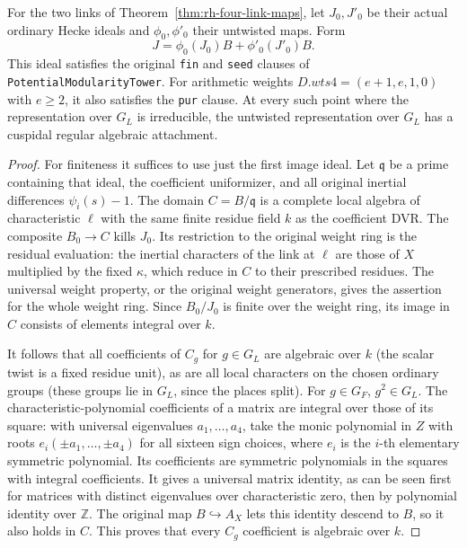 \begin{theorem}
\label{thm:rh-four-image-ideal}
For the two links of Theorem~\ref{thm:rh-four-link-maps}, let
$J_0,J'_0$ be their actual ordinary Hecke ideals and
$\phi_0,\phi'_0$ their untwisted maps. Form
\[
                   J=\phi_0(J_0)B+\phi'_0(J'_0)B .
\]
This ideal satisfies the original \texttt{fin} and
\texttt{seed} clauses of \texttt{PotentialModularityTower}.
For arithmetic weights $D.wts4=(e+1,e,1,0)$ with $e\geq2$,
it also satisfies the \texttt{pur} clause. At every such
point where the representation over $G_L$ is irreducible,
the untwisted representation over $G_L$ has a cuspidal
regular algebraic attachment.
\end{theorem}
\begin{proof}
For finiteness it suffices to use just the first image ideal.
Let $\mathfrak q$ be a prime containing that ideal, the
coefficient uniformizer, and all original inertial
differences $\psi_i(s)-1$. The domain $C=B/\mathfrak q$
is a complete local algebra of characteristic $\ell$ with
the same finite residue field $k$ as the coefficient DVR.
The composite $B_0\to C$ kills $J_0$. Its restriction to
the original weight ring is the residual evaluation:
the inertial characters of the link at $\ell$ are those
of $X$ multiplied by the fixed $\kappa$, which reduce
in $C$ to their prescribed residues. The universal
weight property, or the original weight generators,
gives the assertion for the whole weight ring.
Since $B_0/J_0$ is finite over the weight ring, its image
in $C$ consists of elements integral over $k$.

It follows that all coefficients of $C_g$ for $g\in G_L$
are algebraic over $k$ (the scalar twist is a fixed residue
unit), as are all local characters on the chosen ordinary
groups (these groups lie in $G_L$, since the places split).
For $g\in G_F$, $g^2\in G_L$. The characteristic-polynomial
coefficients of a matrix are integral over those of its square:
with universal eigenvalues $a_1,\ldots,a_4$, take the monic
polynomial in $Z$ with roots
$e_i(\pm a_1,\ldots,\pm a_4)$ for all sixteen sign choices,
where $e_i$ is the $i$-th elementary symmetric polynomial.
Its coefficients are symmetric polynomials in the squares
with integral coefficients. It gives a universal matrix
identity, as can be seen first for matrices with distinct
eigenvalues over characteristic zero, then by polynomial
identity over $\mathbb Z$. The original map $B\hookrightarrow A_X$
lets this identity descend to $B$, so it also holds in $C$.
This proves that every $C_g$ coefficient is algebraic over $k$.


\end{proof}
